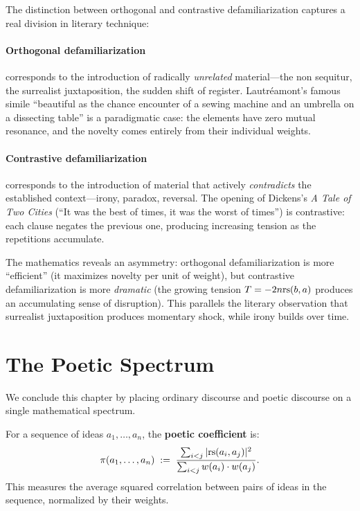 \begin{interpretation}
\label{interp:two-modes}
The distinction between orthogonal and contrastive defamiliarization captures
a real division in literary technique:

\paragraph{Orthogonal defamiliarization} corresponds to the introduction of
radically \emph{unrelated} material---the non sequitur, the surrealist
juxtaposition, the sudden shift of register.  Lautr\'eamont's famous simile
``beautiful as the chance encounter of a sewing machine and an umbrella on a
dissecting table'' is a paradigmatic case: the elements have zero mutual
resonance, and the novelty comes entirely from their individual weights.

\paragraph{Contrastive defamiliarization} corresponds to the introduction of
material that actively \emph{contradicts} the established context---irony,
paradox, reversal.  The opening of Dickens's \textit{A Tale of Two Cities}
(``It was the best of times, it was the worst of times'') is contrastive:
each clause negates the previous one, producing increasing tension as the
repetitions accumulate.

The mathematics reveals an asymmetry: orthogonal defamiliarization is more
``efficient'' (it maximizes novelty per unit of weight), but contrastive
defamiliarization is more \emph{dramatic} (the growing tension $T = -2n\mathrm{rs}(b, a)$
produces an accumulating sense of disruption).  This parallels the literary
observation that surrealist juxtaposition produces momentary shock, while irony
builds over time.
\end{interpretation}


\section{The Poetic Spectrum}

We conclude this chapter by placing ordinary discourse and poetic discourse on a
single mathematical spectrum.

\begin{definition}
\label{def:poetic-coeff}
For a sequence of ideas $a_1, \ldots, a_n$, the \textbf{poetic coefficient} is:
\[
  \pi(a_1, \ldots, a_n)
  \;:=\; \frac{\sum_{i < j} |\mathrm{rs}(a_i, a_j)|^2}
              {\sum_{i < j} w(a_i) \cdot w(a_j)}.
\]
This measures the average squared correlation between pairs of ideas in the
sequence, normalized by their weights.
\end{definition}

